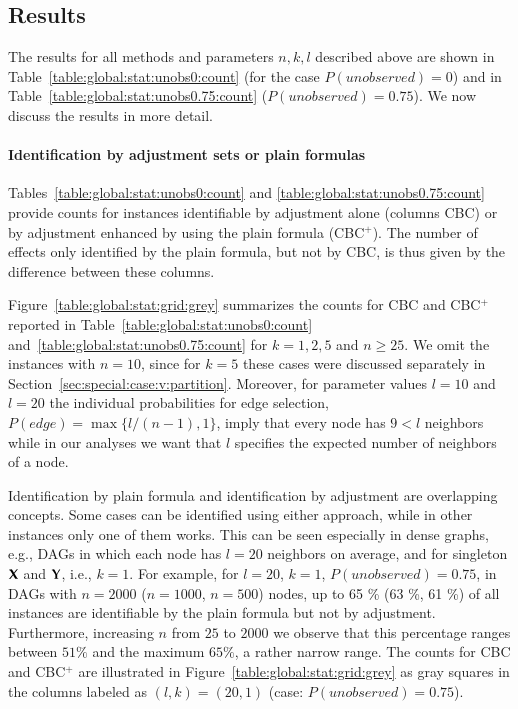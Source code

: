 \subsection{Results}



The results for all methods and parameters $n,k,l$ described above
 are shown in Table~\ref{table:global:stat:unobs0:count} 
(for the case $P(\textit{unobserved})=0$) and in Table~\ref{table:global:stat:unobs0.75:count}
($P(\textit{unobserved})=0.75$). 
We now discuss the results in more detail.

\paragraph{Identification by adjustment sets or plain formulas}
Tables~\ref{table:global:stat:unobs0:count} and  \ref{table:global:stat:unobs0.75:count}
provide counts for instances identifiable by adjustment alone
(columns CBC) or by adjustment enhanced by using the plain formula (CBC$^+$).
The number of effects only identified by the plain formula, but not by CBC,
is thus given by the difference between these columns. 

Figure~\ref{table:global:stat:grid:grey} summarizes 
the counts for CBC and CBC$^+$ reported in Table~\ref{table:global:stat:unobs0:count} 
and~\ref{table:global:stat:unobs0.75:count} for $k=1,2,5$ 
and  $n\ge 25$. We omit the instances with $n=10$, since for $k=5$ these 
cases were discussed separately in Section~\ref{sec:special:case:v:partition}.
Moreover, for  parameter values $l=10$ and $l=20$ the individual probabilities 
for edge selection, $P(\textit{edge})=\max\{l/(n-1),1\}$, 
imply that every node has $9<l$ neighbors while in our analyses we want that $l$
specifies the expected number of neighbors of a node.

Identification by plain formula and identification by adjustment are 
overlapping concepts.
Some cases can be identified using either approach,
while in other instances only one of them works.
This can be seen especially in dense graphs, e.g., DAGs
in which each node has $l=20$ neighbors on average,
and for singleton ${\bf X}$ and ${\bf Y}$, i.e., $k=1$.
For example, for $l=20$, $k=1$, $P(\textit{unobserved}) = 0.75$, 
in DAGs with $n = 2000$  ($n=1000$, $n=500$) nodes, 
up to 65 \%  (63 \%, 61 \%) of all instances  
are identifiable by the plain formula but not by adjustment.
Furthermore, increasing $n$ from $25$ to $2000$ we observe 
that this percentage ranges between $51 \%$ and the maximum $65 \%$, 
a rather narrow range.  
The counts for CBC and CBC$^+$ are illustrated in Figure~\ref{table:global:stat:grid:grey}
as gray squares in the columns labeled as $(l,k)=(20,1)$ (case: $P(\textit{unobserved}) = 0.75$).  

